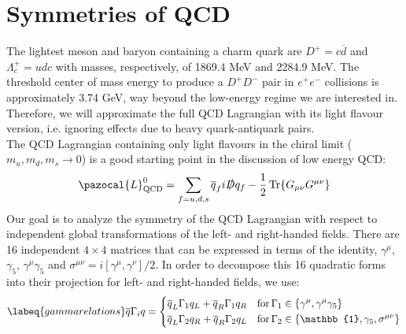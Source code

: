 \documentclass[../main.tex]{subfiles}
\begin{document}
\section{Symmetries of QCD}
The lightest meson and baryon containing a charm quark are $D^+=c\overline{d}$ and $\Lambda_c^+=udc$ with masses, respectively, of 1869.4 MeV and 2284.9 MeV. The threshold center of mass energy to produce a $D^+D^-$ pair in $e^+e^-$ collisions is approximately 3.74 GeV, way beyond the low-energy regime we are interested in. Therefore, we will approximate the full QCD Lagrangian with its light flavour version, i.e. ignoring effects due to heavy quark-antiquark pairs.\\
The QCD Lagrangian containing only light flavours in the chiral limit ($m_u,m_d,m_s\to0$) is a good starting point in the discussion of low energy QCD:
\[
\pazocal{L}_{\text{QCD}}^0=\sum_{f=u,d,s}\overline{q}_fi\slashed{D}q_f-\frac{1}{2}\Tr{G_{\mu\nu}G^{\mu\nu}}
\]
Our goal is to analyze the symmetry of the QCD Lagrangian with respect to independent global transformations of the left- and right-handed fields. There are 16 independent $4\times4$ matrices that can be expressed in terms of the identity, $\gamma^\mu$, $\gamma_5$, $\gamma^\mu\gamma_5$ and $\sigma^{\mu\nu}=i[\gamma^\mu,\gamma^\nu]/2$. In order to decompose this 16 quadratic forms into their projection for left- and right-handed fields, we use:
\begin{equation}
\labeq{gammarelations}
\overline{q}\Gamma_iq=\left\{
\begin{aligned}
&\overline{q}_L\Gamma_1q_L+\overline{q}_R\Gamma_1q_R \quad \text{for}\,\Gamma_1\in\{\gamma^\mu,\gamma^\mu\gamma_5\}\\
&\overline{q}_L\Gamma_2q_R+\overline{q}_R\Gamma_2q_L \quad \text{for}\,\Gamma_2\in\{\mathbb{1},\gamma_5,\sigma^{\mu\nu}\}
\end{aligned}
\right.
\end{equation}
\end{document}
